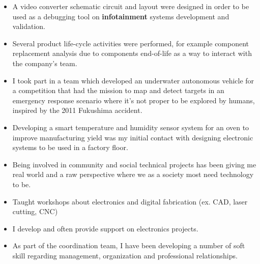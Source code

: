 \documentclass[10pt,a4paper,ragged2e]{altacv}
\begin{document}
\divider

\begin{itemize}
	\item A video converter schematic circuit and layout were designed in order to be used as a debugging tool on \textbf{infotainment} systems development and validation.
	\item Several product life-cycle activities were performed, for example component replacement analysis due to components end-of-life as a way to interact with the company's team. 
\end{itemize}

\divider

\begin{itemize}
	\item I took part in a team which developed an underwater autonomous vehicle for a competition that had the mission to map and detect targets in an emergency response scenario where it's not proper to be explored by humans, inspired by the 2011 Fukushima accident.
\end{itemize}

\divider

\begin{itemize}
	\item Developing a smart temperature and humidity sensor system for an oven to improve manufacturing yield was my initial contact with designing electronic systems to be used in a factory floor. 
\end{itemize}

\newpage


\begin{itemize}
	\item Being involved in community and social technical projects has been giving me real world and a raw perspective where we as a society most need technology to be.
	\item Taught workshops about electronics and digital fabrication (ex. CAD, laser cutting, CNC)
	\item I develop and often provide support on electronics projects.
	\item As part of the coordination team, I have been developing a number of soft skill regarding management, organization and professional relationships. 
\end{itemize}
\end{document}
